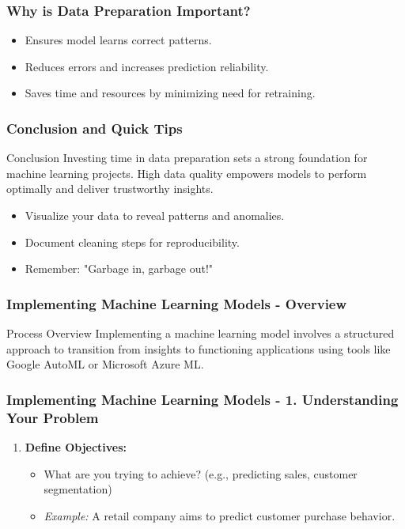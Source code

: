 \documentclass[aspectratio=169]{beamer}
\begin{document}
\begin{frame}[fragile]
    \frametitle{Why is Data Preparation Important?}
    \begin{itemize}
        \item Ensures model learns correct patterns.
        \item Reduces errors and increases prediction reliability.
        \item Saves time and resources by minimizing need for retraining.
    \end{itemize}
\end{frame}

\begin{frame}[fragile]
    \frametitle{Conclusion and Quick Tips}
    \begin{block}{Conclusion}
        Investing time in data preparation sets a strong foundation for machine learning projects. High data quality empowers models to perform optimally and deliver trustworthy insights.
    \end{block}
    \begin{itemize}
        \item Visualize your data to reveal patterns and anomalies.
        \item Document cleaning steps for reproducibility.
        \item Remember: "Garbage in, garbage out!"
    \end{itemize}
\end{frame}

\begin{frame}[fragile]
    \frametitle{Implementing Machine Learning Models - Overview}
    \begin{block}{Process Overview}
        Implementing a machine learning model involves a structured approach to transition from insights to functioning applications using tools like Google AutoML or Microsoft Azure ML.
    \end{block}
\end{frame}

\begin{frame}[fragile]
    \frametitle{Implementing Machine Learning Models - 1. Understanding Your Problem}
    \begin{enumerate}
        \item \textbf{Define Objectives:}
        \begin{itemize}
            \item What are you trying to achieve? (e.g., predicting sales, customer segmentation)
            \item \textit{Example:} A retail company aims to predict customer purchase behavior.
        \end{itemize}
    \end{enumerate}
\end{frame}
\end{document}
